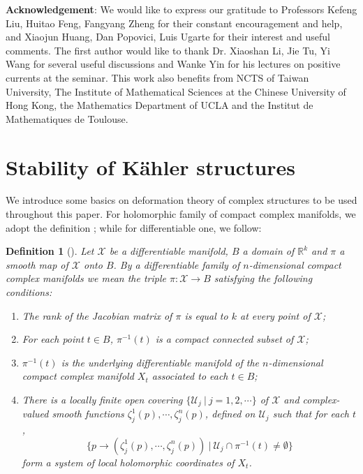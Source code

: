 \documentclass[12pt]{amsart}
\numberwithin{equation}{section}
\newtheorem{definition}  [theorem]     {Definition}
\renewcommand{\1}{\mathds{1}}
\renewcommand{\>}{\rightarrow}
\def\mc{\mathcal}
\begin{document}
\textbf{Acknowledgement}: We would like to express our
gratitude to Professors Kefeng Liu, Huitao Feng, Fangyang
Zheng for their constant encouragement and help, and Xiaojun Huang, Dan Popovici, Luis Ugarte
for their interest and useful comments. The first
author would like to thank Dr. Xiaoshan Li, Jie Tu, Yi Wang for several
useful discussions and Wanke Yin for his lectures on positive currents at the seminar.
This work also benefits from NCTS of
Taiwan University, The Institute of Mathematical Sciences at the
Chinese University of Hong Kong, the Mathematics Department of UCLA
and the Institut de Mathematiques de Toulouse.




\section{Stability of K\"{a}hler structures}\label{kahler-section}
We introduce some basics on deformation theory of complex structures to be used throughout
this paper. For holomorphic family of compact complex manifolds, we adopt the definition \cite[Defition 2.8]{k}; while for differentiable one, we follow:
\begin{definition}[{\cite[Defition 4.1]{k}}]\label{} Let $\mc{X}$ be a differentiable manifold, $B$ a domain of $\mathbb{R}^k$ and $\pi$ a smooth map of $\mc{X}$ onto $B$.
By a \emph{differentiable family of $n$-dimensional compact complex manifolds} we mean the triple $\pi:\mc{X}\to B$ satisfying the following conditions:
\begin{enumerate}[$(i)$]
    \item \label{}
The rank of the Jacobian matrix of $\pi$ is equal to $k$ at every point of $\mc{X}$;
    \item \label{}
For each point $t\in B$, $\pi^{-1}(t)$ is a compact connected subset of $\mc{X}$;
    \item \label{}
$\pi^{-1}(t)$ is the underlying differentiable manifold of the $n$-dimensional compact complex manifold $X_t$ associated to each $t\in B$;
     \item \label{}
There is a locally finite open covering $\{\mathcal{U}_j\ |\ j=1,2,\cdots\}$ of $\mc{X}$ and complex-valued smooth functions $\zeta_j^1(p),\cdots,\zeta_j^n(p)$, defined on $\mathcal{U}_j$
such that for each $t$, $$\{p\rightarrow (\zeta_j^1(p),\cdots,\zeta_j^n(p))\ |\ \mathcal{U}_j\cap \pi^{-1}(t)\neq \emptyset\}$$ form a system of local holomorphic coordinates of $X_t$.
\end{enumerate}
\end{definition}
\end{document}
